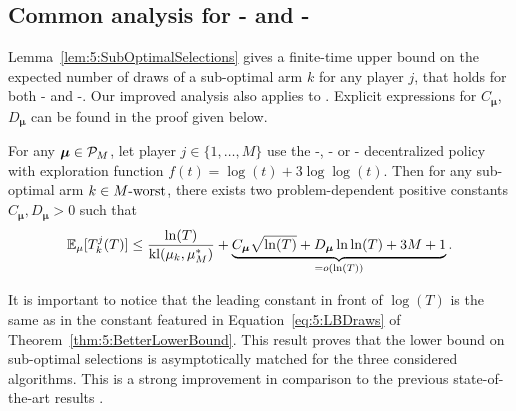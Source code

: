 \subsection{Common analysis for \RandTopM- and \MCTopM-\klUCB{}}\label{sub:5:UpperBoundSelections}

Lemma~\ref{lem:5:SubOptimalSelections} gives a finite-time upper bound on the expected number of draws of a sub-optimal arm $k$ for any player $j$, that
holds for both \RandTopM-\klUCB{} and \MCTopM-\klUCB.
Our improved analysis also applies to \rhoRand{}.
Explicit expressions for $C_{\boldsymbol{\mu}}$, $D_{\boldsymbol{\mu}}$ can be found in the proof given below.

\begin{lemma}\label{lem:5:SubOptimalSelections}
  For any $\boldsymbol{\mu}\in\mathcal{P}_M$,
  let player $j\in\{1,\dots,M\}$ use the \RandTopM-, \MCTopM- or \rhoRand-\klUCB{}
  decentralized policy with exploration function $f(t) = \log(t) + 3 \log\log(t)$.
  Then for any sub-optimal arm $k \in M\text{-}\mathrm{worst}$, there exists two problem-dependent positive constants $C_{\boldsymbol{\mu}}, D_{\boldsymbol{\mu}} > 0$ such that
  \begin{equation}\label{eq:5:SubOptimalSelections}
      \mathbb{E}_{\mu}[T_k^j(T)] \leq
      \frac{\ln(T)}{\mathrm{kl}(\mu_k,\mu_{M}^*)}
      + \underbrace{C_{\boldsymbol{\mu}} \sqrt{\ln(T)} + D_{\boldsymbol{\mu}}\ln\ln(T) + 3M + 1}_{= \mathop{}\mathopen{}o\mathopen{}\left(\ln(T)\right)}.
  \end{equation}
\end{lemma}

It is important to notice that the leading constant in front of $\log(T)$ is the same as in the constant featured in Equation~\eqref{eq:5:LBDraws} of Theorem~\ref{thm:5:BetterLowerBound}. This result proves that the lower bound on sub-optimal selections is asymptotically matched for the three considered algorithms. This is a strong improvement in comparison to the previous state-of-the-art results
\citep{Zhao10,Anandkumar11}.

